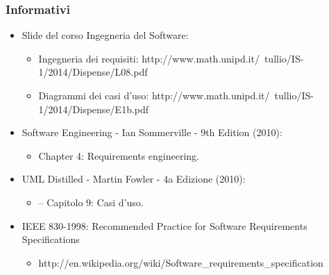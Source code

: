 \subsubsection{Informativi}
\begin{itemize}
	\item Slide del corso Ingegneria del Software:
	\begin{itemize}
		\item Ingegneria dei requisiti: http://www.math.unipd.it/~tullio/IS-1/2014/Dispense/L08.pdf
		\item Diagrammi dei casi d'uso: http://www.math.unipd.it/~tullio/IS-1/2014/Dispense/E1b.pdf
	\end{itemize}
	\item Software Engineering - Ian Sommerville - 9th Edition (2010):
	\begin{itemize}
		\item Chapter 4: Requirements engineering.
	\end{itemize}
	\item \gls{UML} Distilled - Martin Fowler - 4a Edizione (2010):
	\begin{itemize}
		\item – Capitolo 9: Casi d’uso.
	\end{itemize}
	\item IEEE 830-1998: Recommended Practice for Software Requirements Specifications
	\begin{itemize}
		\item http://en.wikipedia.org/wiki/Software_requirements_specification
	\end{itemize}
\end{itemize}